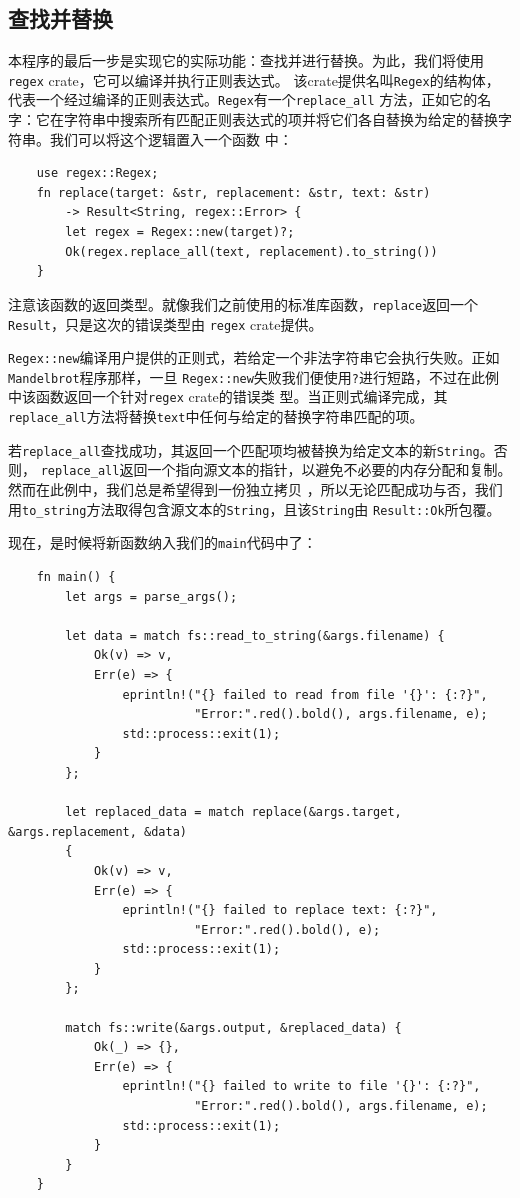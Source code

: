 \subsection{查找并替换}
本程序的最后一步是实现它的实际功能：查找并进行替换。为此，我们将使用\texttt{regex} crate，它可以编译并执行正则表达式。
该crate提供名叫\texttt{Regex}的结构体，代表一个经过编译的正则表达式。\texttt{Regex}有一个\texttt{replace\_all}
方法，正如它的名字：它在字符串中搜索所有匹配正则表达式的项并将它们各自替换为给定的替换字符串。我们可以将这个逻辑置入一个函数
中：
\begin{verbatim}
    use regex::Regex;
    fn replace(target: &str, replacement: &str, text: &str)
        -> Result<String, regex::Error> {
        let regex = Regex::new(target)?;
        Ok(regex.replace_all(text, replacement).to_string())
    }
\end{verbatim}

\smallskip
注意该函数的返回类型。就像我们之前使用的标准库函数，\texttt{replace}返回一个\texttt{Result}，只是这次的错误类型由
\texttt{regex} crate提供。

\medskip
\texttt{Regex::new}编译用户提供的正则式，若给定一个非法字符串它会执行失败。正如\texttt{Mandelbrot}程序那样，一旦
\texttt{Regex::new}失败我们便使用\texttt{?}进行短路，不过在此例中该函数返回一个针对\texttt{regex} crate的错误类
型。当正则式编译完成，其\texttt{replace\_all}方法将替换\texttt{text}中任何与给定的替换字符串匹配的项。

\medskip
若\texttt{replace\_all}查找成功，其返回一个匹配项均被替换为给定文本的新\texttt{String}。否则，
\texttt{replace\_all}返回一个指向源文本的指针，以避免不必要的内存分配和复制。然而在此例中，我们总是希望得到一份独立拷贝
，所以无论匹配成功与否，我们用\texttt{to\_string}方法取得包含源文本的\texttt{String}，且该\texttt{String}由
\texttt{Result::Ok}所包覆。

\medskip
现在，是时候将新函数纳入我们的\texttt{main}代码中了：
\begin{verbatim}
    fn main() {
        let args = parse_args();
        
        let data = match fs::read_to_string(&args.filename) {
            Ok(v) => v,
            Err(e) => {
                eprintln!("{} failed to read from file '{}': {:?}",
                          "Error:".red().bold(), args.filename, e);
                std::process::exit(1);
            }
        };
    
        let replaced_data = match replace(&args.target, &args.replacement, &data) 
        {
            Ok(v) => v,
            Err(e) => {
                eprintln!("{} failed to replace text: {:?}",
                          "Error:".red().bold(), e);
                std::process::exit(1);
            }    
        };
    
        match fs::write(&args.output, &replaced_data) {
            Ok(_) => {},
            Err(e) => {
                eprintln!("{} failed to write to file '{}': {:?}",
                          "Error:".red().bold(), args.filename, e);
                std::process::exit(1);
            }
        }
    }
\end{verbatim}

